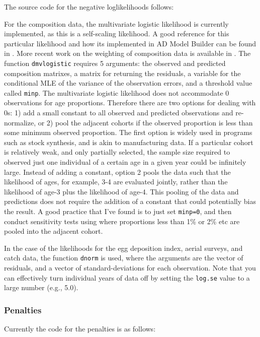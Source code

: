 \documentclass[12pt,letterpaper]{article}
\begin{document}
    The source code for the negative loglikelihoods follows:
    
    
    For the composition data, the multivariate logistic likelihood is currently implemented, as this is a self-scaling likelihood.  A good reference for this particular likelihood and how its implemented in AD Model Builder can be found in \cite{schnute1995influence}.  More recent work on the weighting of composition data is available in \cite{francis2011data}.  The function \texttt{dmvlogistic} requires 5 arguments: the observed and predicted composition matrixes, a matrix for returning the residuals, a variable for the conditional MLE of the variance of the observation errors, and a threshold value called \texttt{minp}. The multivariate logistic likelihood does not accommodate 0 observations for age proportions.  Therefore there are two options for dealing with 0s: 1) add a small constant to all observed and predicted observations and re-normalize, or 2) pool the adjacent cohorts if the observed proportion is less than some minimum observed proportion.  The first option is widely used in programs such as stock synthesis, and is akin to manufacturing data.  If a particular cohort is relatively weak, and only partially selected, the sample size required to observed just one individual of a certain age in a given year could be infinitely large.  Instead of adding a constant, option 2 pools the data such that the likelihood of ages, for example, 3-4 are evaluated jointly, rather than the likelihood of age-3 plus the likelihood of age-4.  This pooling of the data and predictions does not require the addition of a constant that could potentially bias the result.  A good practice that I've found is to just set \texttt{minp=0}, and then conduct sensitivity tests using where proportions less than 1\% or 2\% etc are pooled into the adjacent cohort.

    In the case of the likelihoods for the egg deposition index, aerial surveys, and catch data, the function \texttt{dnorm} is used, where the arguments are the vector of residuals, and a vector of standard-deviations for each observation.  Note that you can effectively turn individual years of data off by setting the \texttt{log.se} value to a large number (e.g., 5.0).

    \subsubsection{Penalties} %
    \label{ssub:penalties}
    Currently the code for the penalties is as follows:
    
\end{document}
